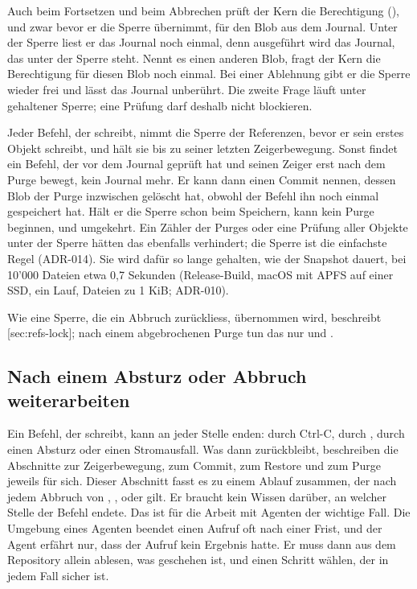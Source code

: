 {Auch beim Fortsetzen und beim Abbrechen prüft der Kern die Berechtigung (),
und zwar bevor er die Sperre übernimmt, für den Blob aus dem Journal.
Unter der Sperre liest er das Journal noch einmal,
denn ausgeführt wird das Journal, das unter der Sperre steht.
Nennt es einen anderen Blob, fragt der Kern die Berechtigung für diesen Blob noch einmal.
Bei einer Ablehnung gibt er die Sperre wieder frei und lässt das Journal unberührt.
Die zweite Frage läuft unter gehaltener Sperre; eine Prüfung darf deshalb nicht blockieren.

Jeder Befehl, der schreibt, nimmt die Sperre der Referenzen,
bevor er sein erstes Objekt schreibt, und hält sie bis zu seiner letzten Zeigerbewegung.
Sonst findet ein Befehl, der vor dem Journal geprüft hat
und seinen Zeiger erst nach dem Purge bewegt, kein Journal mehr.
Er kann dann einen Commit nennen, dessen Blob der Purge inzwischen gelöscht hat,
obwohl der Befehl ihn noch einmal gespeichert hat.
Hält er die Sperre schon beim Speichern, kann kein Purge beginnen, und umgekehrt.
Ein Zähler der Purges oder eine Prüfung aller Objekte unter der Sperre
hätten das ebenfalls verhindert; die Sperre ist die einfachste Regel (ADR-014).
Sie wird dafür so lange gehalten, wie der Snapshot dauert,
bei 10'000 Dateien etwa 0,7 Sekunden
(Release-Build, macOS mit APFS auf einer SSD, ein Lauf, Dateien zu 1 KiB; ADR-010).

Wie eine Sperre, die ein Abbruch zurückliess, übernommen wird, beschreibt
[sec:refs-lock]; nach einem abgebrochenen Purge tun das nur 
und .

\subsection[sec:recovery]{Nach einem Absturz oder Abbruch weiterarbeiten}

Ein Befehl, der schreibt, kann an jeder Stelle enden:
durch Ctrl-C, durch , durch einen Absturz oder einen Stromausfall.
Was dann zurückbleibt, beschreiben die Abschnitte zur Zeigerbewegung, zum Commit, zum Restore
und zum Purge jeweils für sich.
Dieser Abschnitt fasst es zu einem Ablauf zusammen,
der nach jedem Abbruch von , ,  oder 
gilt.
Er braucht kein Wissen darüber, an welcher Stelle der Befehl endete.
Das ist für die Arbeit mit Agenten der wichtige Fall.
Die Umgebung eines Agenten beendet einen Aufruf oft nach einer Frist,
und der Agent erfährt nur, dass der Aufruf kein Ergebnis hatte.
Er muss dann aus dem Repository allein ablesen, was geschehen ist,
und einen Schritt wählen, der in jedem Fall sicher ist.

}
